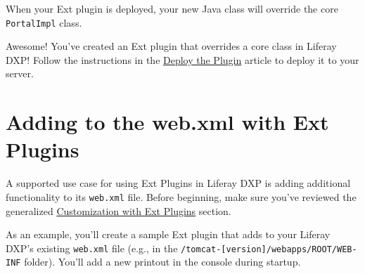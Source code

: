 When your Ext plugin is deployed, your new Java class will override the
core \texttt{PortalImpl} class.

Awesome! You've created an Ext plugin that overrides a core class in
Liferay DXP! Follow the instructions in the
\href{/docs/7-2/customization/-/knowledge_base/c/deploying-an-ext-plugin}{Deploy
the Plugin} article to deploy it to your server.

\chapter{Adding to the web.xml with Ext
Plugins}\label{adding-to-the-web.xml-with-ext-plugins}

A supported use case for using Ext Plugins in Liferay DXP is adding
additional functionality to its \texttt{web.xml} file. Before beginning,
make sure you've reviewed the generalized
\href{/docs/7-2/customization/-/knowledge_base/c/customizing-core-functionality-with-ext}{Customization
with Ext Plugins} section.

As an example, you'll create a sample Ext plugin that adds to your
Liferay DXP's existing \texttt{web.xml} file (e.g., in the
\texttt{/tomcat-{[}version{]}/webapps/ROOT/WEB-INF} folder). You'll add
a new printout in the console during startup.

